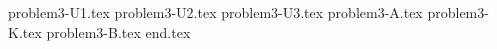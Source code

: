 \documentclass{../../../../style/mkimain}
\begin{document}
{problem3-U1.tex}
{problem3-U2.tex}
{problem3-U3.tex}
{problem3-A.tex}
{problem3-K.tex}
{problem3-B.tex}
{end.tex}
\end{document}
